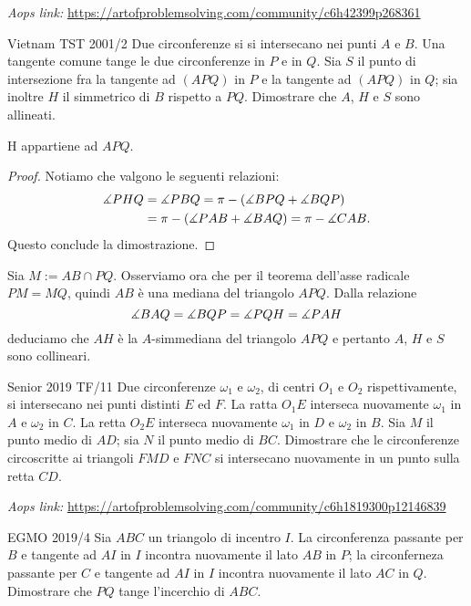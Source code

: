 \documentclass{article}
\begin{document}
\vspace{0.5cm}
\textit{Aops link:}
\href{https://artofproblemsolving.com/community/c6h42399p268361}
{https://artofproblemsolving.com/community/c6h42399p268361}

\begin{proposition}{Vietnam TST 2001/2}{}
	Due circonferenze si si intersecano nei punti $A$ e $B$.
	Una tangente comune tange le due circonferenze in $P$ e in $Q$.
	Sia $S$ il punto di intersezione fra la tangente ad $(APQ)$ in $P$
	e la tangente ad $(APQ)$ in $Q$; sia inoltre $H$ il simmetrico di $B$
	rispetto a $PQ$. Dimostrare che $A$, $H$ e $S$ sono allineati.
\end{proposition}

\begin{claim*}{}{}
	H appartiene ad $APQ$.
\end{claim*}
\begin{proof}
	Notiamo che valgono le seguenti relazioni:
	\begin{align*}
		\measuredangle{PHQ}&=\measuredangle{PBQ}=\pi-(\measuredangle{BPQ}+\measuredangle{BQP}) \\
					 &=\pi-(\measuredangle{PAB}+\measuredangle{BAQ})=\pi-\measuredangle{CAB}.
	\end{align*}
	Questo conclude la dimostrazione.
\end{proof}
Sia $M:=AB\cap PQ$. Osserviamo ora che per il teorema
dell'asse radicale $PM=MQ$, quindi $AB$ è una mediana
del triangolo $APQ$. Dalla relazione
\begin{equation*}
	\measuredangle{BAQ}=\measuredangle{BQP}=\measuredangle{PQH}=\measuredangle{PAH}
\end{equation*}
deduciamo che $AH$ è la $A$-simmediana del triangolo $APQ$ e pertanto
$A$, $H$ e $S$ sono collineari.

\begin{proposition}{Senior 2019 TF/11}{}
	Due circonferenze $\omega_1$ e $\omega_2$, di centri $O_1$ e $O_2$
	rispettivamente, si intersecano nei punti distinti $E$ ed $F$.
	La ratta $O_1E$ interseca nuovamente $\omega_1$ in $A$ e $\omega_2$ in $C$.
	La retta $O_2E$ interseca nuovamente $\omega_1$ in $D$ e $\omega_2$ in $B$.
	Sia $M$ il punto medio di $AD$; sia $N$ il punto medio di $BC$. Dimostrare
	che le circonferenze circoscritte ai triangoli $FMD$ e $FNC$
	si intersecano nuovamente in un punto sulla retta $CD$.
\end{proposition}

\vspace{0.5cm}
\textit{Aops link:}
\href{https://artofproblemsolving.com/community/c6h1819300p12146839}
{https://artofproblemsolving.com/community/c6h1819300p12146839}
\begin{proposition}{EGMO 2019/4}{}
	Sia $ABC$ un triangolo di incentro $I$.
	La circonferenza passante per $B$ e tangente ad $AI$ in $I$
	incontra nuovamente il lato $AB$ in $P$; la circonferneza
	passante per $C$ e tangente ad $AI$ in $I$ incontra nuovamente
	il lato $AC$ in $Q$. Dimostrare che $PQ$ tange l'incerchio di $ABC$.
\end{proposition}
\end{document}
